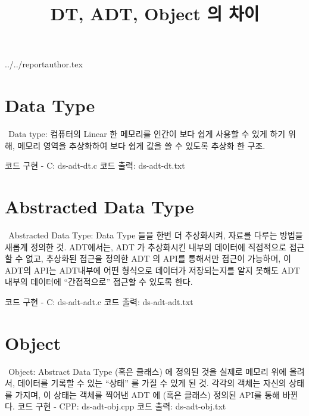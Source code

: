 \documentclass {article}
\begin{document}
\title {DT, ADT, Object 의 차이}
 {../../reportauthor.tex}
\maketitle

\section {Data Type}
\(~~\)Data type: 컴퓨터의 Linear 한 메모리를 인간이 보다 쉽게 사용할 수 있게 하기 위해, 메모리 영역을 추상화하여 보다 쉽게 값을 쓸 수 있도록 추상화 한 구조.
\vspace{\baselineskip}

코드 구현 - C:
{ds-adt-dt.c}
\vspace{\baselineskip}
코드 출력:
{ds-adt-dt.txt}

\section {Abstracted Data Type}
\(~~\)Abstracted Data Type: Data Type 들을 한번 더 추상화시켜, 자료를 다루는 방법을 새롭게 정의한 것.
ADT에서는, ADT 가 추상화시킨 내부의 데이터에 직접적으로 접근할 수 없고, 추상화된 접근을 정의한 ADT 의 API를 통해서만 접근이 가능하며, 이 ADT의 API는 ADT내부에 어떤 형식으로\linebreak
데이터가 저장되는지를 알지 못해도 ADT 내부의 데이터에 ``간접적으로'' 접근할 수 있도록 한다.

\vspace{\baselineskip}
코드 구현 - C:
{ds-adt-adt.c}
\vspace{\baselineskip}
코드 출력:
{ds-adt-adt.txt}
\vspace{\baselineskip}
\section {Object}
\(~~\)Object: Abstract Data Type (혹은 클래스) 에 정의된 것을 실제로 메모리 위에 올려서, 데이터를 기록할 수 있는 ``상태'' 를 가질 수 있게 된 것. 각각의 객체는 자신의 상태를 가지며, 이 상태는 객체를 찍어낸 ADT 에 (혹은 클래스) 정의된 API를 통해 바뀐다.
\vspace{\baselineskip}
코드 구현 - CPP:
{ds-adt-obj.cpp}
코드 출력:
{ds-adt-obj.txt}
\end{document}
